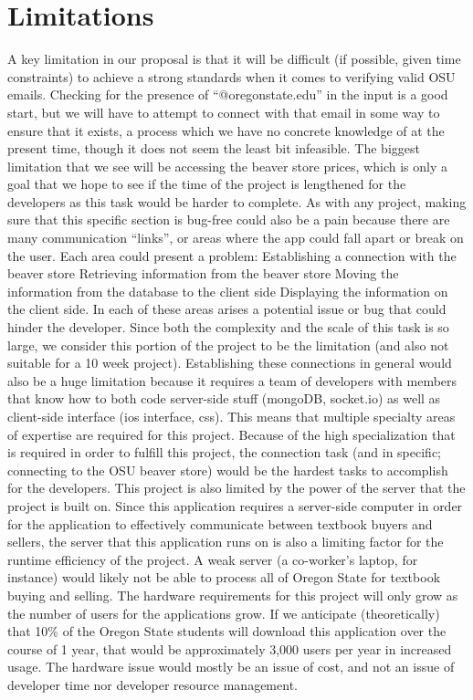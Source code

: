\documentclass[12pt]{article}
\begin{document}
\section{Limitations}
A key limitation in our proposal is that it will be difficult (if possible, given time constraints) to achieve a strong standards when it comes to verifying valid OSU emails. Checking for the presence of “@oregonstate.edu” in the input is a good start, but we will have to attempt to connect with that email in some way to ensure that it exists, a process which we have no concrete knowledge of at the present time, though it does not seem the least bit infeasible. The biggest limitation that we see will be accessing the beaver store prices, which is only a goal that we hope to see if the time of the project is lengthened for the developers as this task would be harder to complete. As with any project, making sure that this specific section is bug-free could also be a pain because there are many communication “links”, or areas where the app could fall apart or break on the user. Each area could present a problem:
Establishing a connection with the beaver store
Retrieving information from the beaver store
Moving the information from the database to the client side
Displaying the information on the client side. In each of these areas arises a potential issue or bug that could hinder the developer. Since both the complexity and the scale of  this task is so large, we consider this portion of the project to be the limitation (and also not suitable for a 10 week project). Establishing these connections in general would also be a huge limitation because it requires a team of developers with members that know how to both code server-side stuff (mongoDB, socket.io) as well as client-side interface (ios interface, css). This means that multiple specialty areas of expertise are required for this project. Because of the high specialization that is required in order to fulfill this project, the connection task (and in specific; connecting to the OSU beaver store) would be the hardest tasks to accomplish for the developers. 
This project is also limited by the power of the server that the project is built on. Since this application requires a server-side computer in order for the application to effectively communicate between textbook buyers and sellers, the server that this application runs on is also a limiting factor for the runtime efficiency of the project. A weak server (a co-worker’s laptop, for instance) would likely not be able to process all of Oregon State for textbook buying and selling. The hardware requirements for this project will only grow as the number of users for the applications grow. If we anticipate (theoretically) that 10\% of the Oregon State students will download this application over the course of 1 year, that would be approximately 3,000 users per year in increased usage. The hardware issue would mostly be an issue of cost, and not an issue of developer time nor developer resource management.
\end{document}
